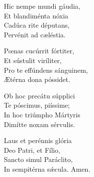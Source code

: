 Hic nempe mundi gáudia,\\
Et blandiménta nóxia\\
Cadúca rite députans,\\
Pervénit ad cæléstia.

Pœnas cucúrrit fórtiter,\\
Et sústulit viríliter,\\
Pro te effúndens sánguinem,\\
Ætérna dona póssidet.

Ob hoc precátu súpplici\\
Te póscimus, piíssime;\\
In hoc triúmpho Mártyris\\
Dimítte noxam sérvulis.

Laus et perénnis glória\\
Deo Patri, et Fílio,\\
Sancto simul Paráclito,\\
In sempitérna sǽcula.
Amen.